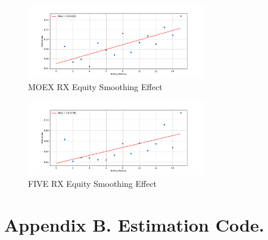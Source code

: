     \begin{figure}[h]
        \centering
        \includegraphics[width=0.7\textwidth]{fig/MOEX RX Equity Smoothing Effect.pdf}
        \caption{MOEX RX Equity Smoothing Effect}
    \end{figure} 

    \begin{figure}[h]
        \centering
        \includegraphics[width=0.7\textwidth]{fig/FIVE RX Equity Smoothing Effect.pdf}
        \caption{FIVE RX Equity Smoothing Effect}
    \end{figure}  


    
    

\clearpage

\section*{Appendix B. Estimation Code.}
    
    
     